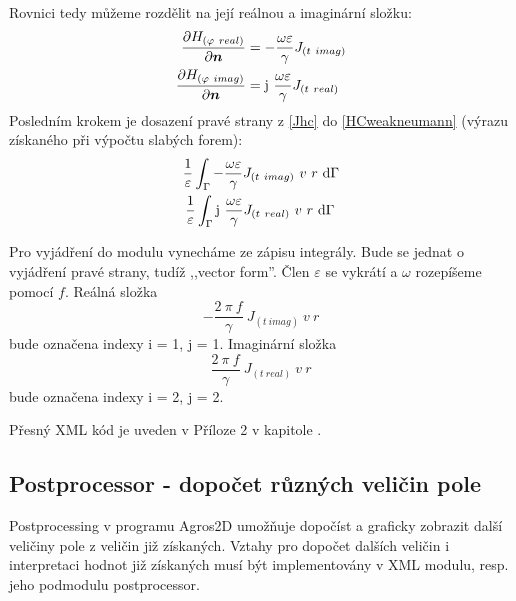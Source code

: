 \documentclass[12pt,a4paper,oneside]{article}
\numberwithin{equation}{section} %
\numberwithin{figure}{section} %
\numberwithin{table}{section} %
\newcommand{\mj}{\mathrm{j}} %
\renewcommand{\vec}[1]{\mbox{\boldmath$#1$}} %
\begin{document}
Rovnici tedy můžeme rozdělit na její reálnou a imaginární složku:
\begin{subequations}
\label{Jhc}
\begin{align}
\frac{\partial H _{(\varphi ~real)}}{\partial \vec{n}} &= - \frac{\omega \varepsilon}{\gamma}  J _{(t~imag)}
\\
\frac{\partial H _{(\varphi ~imag)}}{\partial \vec{n}} &= \mj ~ \frac{\omega \varepsilon}{\gamma} J _{(t~real)}
\end{align}
\end{subequations}
Posledním krokem je dosazení pravé strany z \ref{Jhc} do \ref{HCweakneumann} (výrazu získaného při výpočtu slabých forem):
\begin{subequations}
\begin{align}
\frac{1}{\varepsilon} \int _{\Gamma} - \frac{\omega \varepsilon}{\gamma} J _{(t~imag)} ~ v ~ r ~ \ud \Gamma
\\
\frac{1}{\varepsilon} \int _{\Gamma} \mj ~ \frac{\omega \varepsilon}{\gamma} J _{(t~real)} ~ v ~ r ~ \ud \Gamma ~
\end{align}
\end{subequations}

Pro vyjádření do modulu vynecháme ze zápisu integrály. Bude se jednat o vyjádření pravé strany, tudíž ,,vector form''. Člen $\varepsilon$ se vykrátí a $\omega$ rozepíšeme pomocí $f$. Reálná složka  
\begin{equation}
- \frac{2 ~ \pi ~ f}{\gamma} ~ J_{(t~imag)} ~ v ~ r
\end{equation} 
bude označena indexy i = 1, j = 1. Imaginární složka 
\begin{equation}
\frac{2 ~ \pi ~ f}{\gamma} ~ J_{(t~real)} ~ v ~ r
\end{equation}
bude označena indexy i = 2, j = 2.

Přesný XML kód je uveden v Příloze 2 v kapitole .




\subsection{Postprocessor - dopočet různých veličin pole}
\label{postprocesor}
Postprocessing v programu Agros2D umožňuje dopočíst a graficky zobrazit další veličiny pole z veličin již získaných. Vztahy pro dopočet dalších veličin i interpretaci hodnot již získaných musí být implementovány v XML modulu, resp. jeho podmodulu postprocessor.
\end{document}
